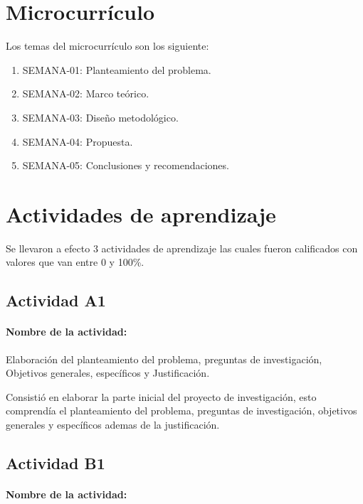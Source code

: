\documentclass[a4paper,12pt]{article}
\begin{document}
\section{Microcurrículo}
\label{sec:microcurriculo}

Los temas del microcurrículo son los siguiente:
\begin{enumerate}
\item SEMANA-01: Planteamiento del problema.
\item SEMANA-02: Marco teórico.
\item SEMANA-03: Diseño metodológico.
\item SEMANA-04: Propuesta.
\item SEMANA-05: Conclusiones y recomendaciones.
\end{enumerate}

\section{Actividades de aprendizaje}
\label{sec:activ-de-aprend}

Se llevaron a efecto 3 actividades de aprendizaje las cuales fueron calificados con valores que van entre 0 y 100\%.

\subsection{Actividad A1}
\label{sec:actividad-a1}

\paragraph{Nombre de la actividad:}

Elaboración del planteamiento del problema, preguntas de investigación, Objetivos generales, específicos y Justificación.

Consistió en elaborar la parte inicial del proyecto de investigación, esto comprendía el planteamiento del problema, preguntas de investigación, objetivos generales y específicos ademas de la justificación.

\subsection{Actividad B1}
\label{sec:actividad-b1}

\paragraph{Nombre de la actividad:}
\end{document}
